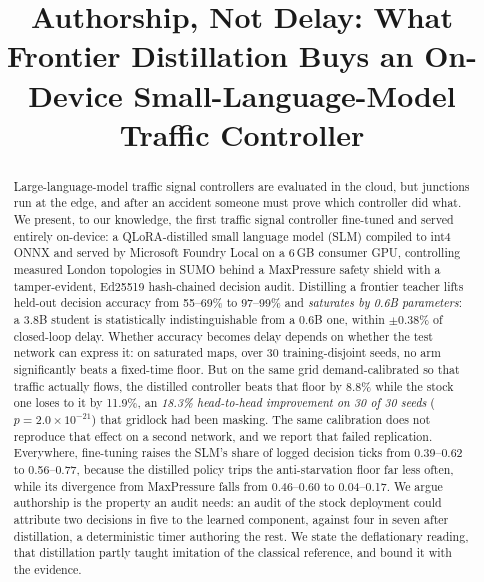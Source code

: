 \documentclass[conference]{IEEEtran}
\begin{document}
\title{Authorship, Not Delay: What Frontier Distillation Buys an On-Device
Small-Language-Model Traffic Controller}

\author{
\and
{}
\and
{}
}

\maketitle

\begin{abstract}
Large-language-model traffic signal controllers are evaluated in the cloud,
but junctions run at the edge, and after an accident someone must prove
which controller did what. We present, to our knowledge, the first traffic
signal controller fine-tuned and served entirely on-device: a
QLoRA-distilled small language model (SLM) compiled to int4 ONNX and served by Microsoft Foundry
Local on a 6\,GB consumer GPU, controlling measured London topologies in SUMO
behind a MaxPressure safety shield with a tamper-evident, Ed25519 hash-chained
decision audit. Distilling a frontier teacher lifts held-out decision accuracy
from 55--69\% to 97--99\% and \emph{saturates by 0.6B parameters}: a 3.8B
student is statistically indistinguishable from a 0.6B one, within
$\pm0.38\%$ of closed-loop delay. Whether accuracy becomes delay depends on
whether the test network can express it: on saturated maps, over 30
training-disjoint seeds, no arm significantly beats a fixed-time floor.
But on the same grid demand-calibrated so that traffic actually flows,
the distilled controller beats that floor by 8.8\% while the stock one
loses to it by 11.9\%, an \emph{18.3\% head-to-head improvement on 30 of
30 seeds} ($p{=}2.0{\times}10^{-21}$) that gridlock had been masking. The same
calibration does not reproduce that effect on a second network, and we
report that failed replication. Everywhere,
fine-tuning raises the SLM's share of logged decision ticks from
0.39--0.62 to 0.56--0.77, because the distilled policy trips the
anti-starvation floor far less often, while its divergence from
MaxPressure falls from 0.46--0.60 to 0.04--0.17. We argue authorship is
the property an audit needs: an audit of the stock deployment could
attribute two decisions in five to the learned component, against four in
seven after distillation, a deterministic timer authoring the
rest. We state the deflationary reading, that distillation partly
taught imitation of the classical reference, and bound it with the
evidence.
\end{abstract}
\end{document}
